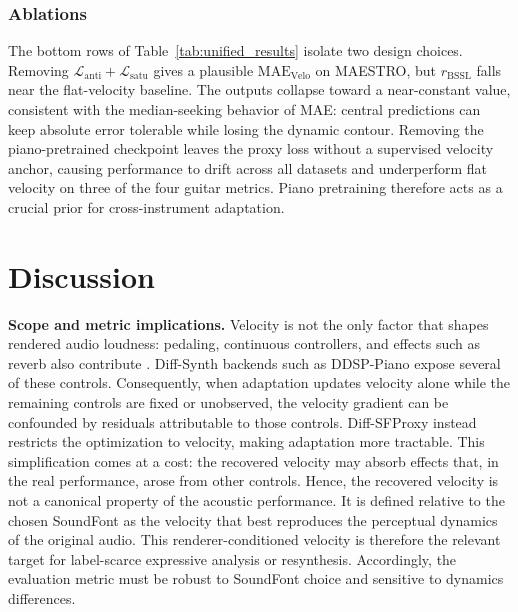 \documentclass{article}
\begin{document}
\subsubsection{Ablations}
The bottom rows of Table~\ref{tab:unified_results} isolate two design choices. Removing $\mathcal{L}_{\mathrm{anti}}+\mathcal{L}_{\mathrm{satu}}$ gives a plausible $\mathrm{MAE}_{\mathrm{Velo}}$ on MAESTRO, but $r_{\mathrm{BSSL}}$ falls near the flat-velocity baseline. The outputs collapse toward a near-constant value, consistent with the median-seeking behavior of MAE: central predictions can keep absolute error tolerable while losing the dynamic contour. Removing the piano-pretrained checkpoint leaves the proxy loss without a supervised velocity anchor, causing performance to drift across all datasets and underperform flat velocity on three of the four guitar metrics. Piano pretraining therefore acts as a crucial prior for cross-instrument adaptation.


\section{Discussion}
\label{sec:discussion}

\textbf{Scope and metric implications.}
Velocity is not the only factor that shapes rendered audio loudness: pedaling, continuous controllers, and effects such as reverb also contribute \cite{ryu2024midfild}. Diff-Synth backends such as DDSP-Piano expose several of these controls. Consequently, when adaptation updates velocity alone while the remaining controls are fixed or unobserved, the velocity gradient can be confounded by residuals attributable to those controls. Diff-SFProxy instead restricts the optimization to velocity, making adaptation more tractable. This simplification comes at a cost: the recovered velocity may absorb effects that, in the real performance, arose from other controls. Hence, the recovered velocity is not a canonical property of the acoustic performance. It is defined relative to the chosen SoundFont as the velocity that best reproduces the perceptual dynamics of the original audio. This renderer-conditioned velocity is therefore the relevant target for label-scarce expressive analysis or resynthesis. Accordingly, the evaluation metric must be robust to SoundFont choice and sensitive to dynamics differences.
\end{document}
